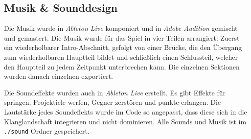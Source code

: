 \subsection{Musik \& Sounddesign}

Die Musik wurde in \textit{Ableton Live} komponiert und in \textit{Adobe Audition} gemischt und gemastert.
Die Musik wurde für das Spiel in vier Teilen arrangiert:
Zuerst ein wiederholbarer Intro-Abschnitt, gefolgt von einer Brücke, die den Übergang zum wiederholbaren Hauptteil bildet und schließlich einen Schlussteil, welcher den Hauptteil zu jedem Zeitpunkt unterbrechen kann.
Die einzelnen Sektionen wurden danach einzelnen exportiert.

Die Soundeffekte wurden auch in \textit{Ableton Live} erstellt.
Es gibt Effekte für springen, Projektiele werfen, Gegner zerstören und punkte erlangen.
Die Lautstärke jedes Soundeffekts wurde im Code so angepasst, dass diese sich in die Klanglandschaft integrieren und nicht dominieren.
Alle Sounds und Musik ist im \texttt{./sound} Ordner gespeichert.
